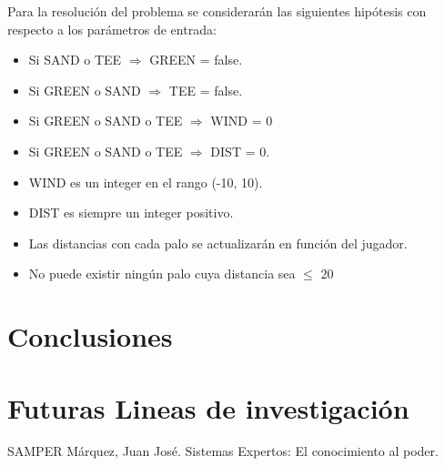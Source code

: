 \documentclass[runningheads,a4paper]{llncs}
\begin{document}
Para la resolución del problema se considerarán las siguientes hipótesis con respecto a los parámetros de entrada:\\
\begin{itemize}
	\item Si SAND o TEE $\Rightarrow$ GREEN = false.
	\item Si GREEN o SAND $\Rightarrow$ TEE = false.
	\item Si GREEN o SAND o TEE $\Rightarrow$ WIND = 0 
	\item Si GREEN o SAND o TEE $\Rightarrow$ DIST = 0.
	\item WIND es un integer en el rango (-10, 10).
	\item DIST es siempre un integer positivo.
	\item Las distancias con cada palo se actualizarán en función del jugador.
	\item No puede existir ningún palo cuya distancia sea $\leq$ 20
\end{itemize}


\section{Conclusiones}

\section{Futuras Lineas de investigación}



\begin{thebibliography}{7}

 SAMPER Márquez, Juan José. Sistemas Expertos: El conocimiento al poder.

\end{thebibliography}
\end{document}
